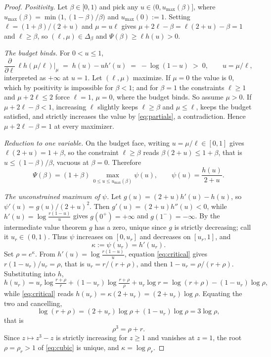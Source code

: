 \documentclass[11pt]{amsart}
\theoremstyle{definition}
\theoremstyle{remark}
\begin{document}
\begin{proof}
\emph{Positivity.} Let $\beta\in[0,1)$ and pick any $u\in(0,u_{\max}(\beta)]$, where $u_{\max}(\beta)=\min\big(1,(1-\beta)/\beta\big)$ and $u_{\max}(0):=1$. Setting $\ell=(1+\beta)/(2+u)$ and $\mu=u\ell$ gives $\mu+2\ell-\beta=\ell(2+u)-\beta=1$ and $\ell\ge\beta$, so $(\ell,\mu)\in \Delta_\beta$ and $\Psi(\beta)\ge\ell h(u)>0$.

\emph{The budget binds.} For $0<u\le1$,
\begin{equation}\label{eq:partials}
\frac{\partial}{\partial\ell}\,\ell h(\mu/\ell)\Big|_{\mu}\;=\;h(u)-u h'(u)\;=\;-\log(1-u)\;>\;0,
\qquad u=\mu/\ell ,
\end{equation}
interpreted as $+\infty$ at $u=1$. Let $(\ell,\mu)$ maximize. If $\mu=0$ the value is $0$, which by positivity is impossible for $\beta<1$; and for $\beta=1$ the constraints $\ell\ge1$ and $\mu+2\ell\le2$ force $\ell=1$, $\mu=0$, where the budget binds. So assume $\mu>0$. If $\mu+2\ell-\beta<1$, increasing $\ell$ slightly keeps $\ell\ge\beta$ and $\mu\le\ell$, keeps the budget satisfied, and strictly increases the value by \eqref{eq:partials}, a contradiction. Hence $\mu+2\ell-\beta=1$ at every maximizer.

\emph{Reduction to one variable.} On the budget face, writing $u=\mu/\ell\in[0,1]$ gives $\ell(2+u)=1+\beta$, so the constraint $\ell\ge\beta$ reads $\beta(2+u)\le1+\beta$, that is $u\le(1-\beta)/\beta$, vacuous at $\beta=0$. Therefore
\[
\Psi(\beta)=(1+\beta)\,\max_{0\le u\le u_{\max}(\beta)}\psi(u),
\qquad
\psi(u)=\frac{h(u)}{2+u}.
\]

\emph{The unconstrained maximum of $\psi$.} Let $g(u)=(2+u)h'(u)-h(u)$, so $\psi'(u)=g(u)/(2+u)^2$. Then $g'(u)=(2+u)h''(u)<0$, while $h'(u)=\log\frac{r(1-u)}{u}$ gives $g(0^{+})=+\infty$ and $g(1^{-})=-\infty$. By the intermediate value theorem $g$ has a zero, unique since $g$ is strictly decreasing; call it $u_r\in(0,1)$. Thus $\psi$ increases on $[0,u_r]$ and decreases on $[u_r,1]$, and
\begin{equation}\label{eq:critical}
\kappa:=\psi(u_r)=h'(u_r).
\end{equation}
Set $\rho=e^{\kappa}$. From $h'(u)=\log\frac{r(1-u)}{u}$, equation \eqref{eq:critical} gives $r(1-u_r)/u_r=\rho$, that is $u_r=r/(r+\rho)$, and then $1-u_r=\rho/(r+\rho)$. Substituting into $h$,
\[
h(u_r)=u_r\log\tfrac{r+\rho}{r}+(1-u_r)\log\tfrac{r+\rho}{\rho}+u_r\log r
=\log(r+\rho)-(1-u_r)\log\rho ,
\]
while \eqref{eq:critical} reads $h(u_r)=\kappa(2+u_r)=(2+u_r)\log\rho$. Equating the two and cancelling,
\[
\log(r+\rho)=(2+u_r)\log\rho+(1-u_r)\log\rho=3\log\rho,
\]
that is
\begin{equation}\label{eq:cubic}
\rho^{3}=\rho+r .
\end{equation}
Since $z\mapsto z^{3}-z$ is strictly increasing for $z\ge1$ and vanishes at $z=1$, the root $\rho=\rho_r>1$ of \eqref{eq:cubic} is unique, and $\kappa=\log\rho_r$.


\end{proof}
\end{document}
